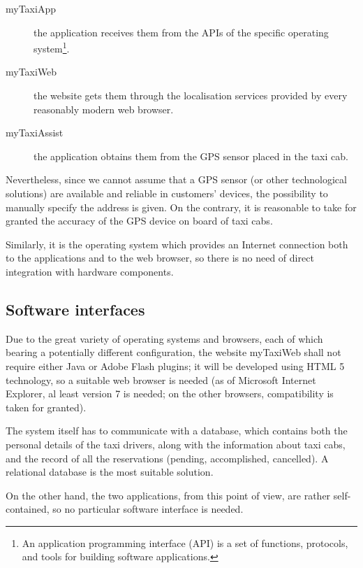 \begin{description}
	
	\item [myTaxiApp] the application receives them from the APIs of the specific operating system\footnote{An application programming interface (API) is a set of functions, protocols, and tools for building software applications.}.
	
	\item [myTaxiWeb] the website gets them through the localisation services provided by every reasonably modern web browser.
	
	\item [myTaxiAssist] the application obtains them from the GPS sensor placed in the taxi cab.

\end{description}

Nevertheless, since we cannot assume that a GPS sensor (or other technological solutions) are available and reliable in customers' devices, the possibility to manually specify the address is given. On the contrary, it is reasonable to take for granted the accuracy of the GPS device on board of taxi cabs.   

Similarly, it is the operating system which provides an Internet connection both to the applications and to the web browser, so there is no need of direct integration with hardware components.


\subsection{Software interfaces}
Due to the great variety of operating systems and browsers, each of which bearing a potentially different configuration, the website myTaxiWeb shall not require either Java or Adobe Flash plugins; it will be developed using HTML 5 technology, so a suitable web browser is needed (as of Microsoft Internet Explorer, al least version 7 is needed; on the other browsers, compatibility is taken for granted). 

The system itself has to communicate with a database, which contains both the personal details of the taxi drivers, along with the information about taxi cabs, and the record of all the reservations (pending, accomplished, cancelled). A relational database is the most suitable solution.

On the other hand, the two applications, from this point of view, are rather self-contained, so no particular software interface is needed.


